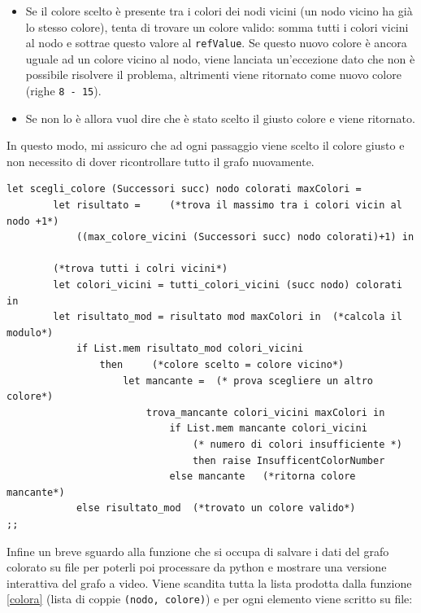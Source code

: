 \begin{itemize}
	\item Se il colore scelto è presente tra i colori dei nodi vicini (un nodo vicino ha già lo stesso colore), tenta di trovare un colore valido: somma tutti i colori vicini al nodo e sottrae questo valore al \lstinline[style=cmd]|refValue|. Se questo nuovo colore è ancora uguale ad un colore vicino al nodo, viene lanciata un'eccezione dato che non è possibile risolvere il problema, altrimenti viene ritornato come nuovo colore (righe \lstinline[style=cmd]|8 - 15|).
	\item Se non lo è allora vuol dire che è stato scelto il giusto colore e viene ritornato.
\end{itemize}

In questo modo, mi assicuro che ad ogni passaggio viene scelto il colore giusto e non necessito di dover ricontrollare tutto il grafo nuovamente.\\

\begin{lstlisting}[style=caml, caption={Funzione ausiliaria a \autoref{colora} che sceglie un colore per il nodo (se possibile).}]
	let scegli_colore (Successori succ) nodo colorati maxColori = 
		let risultato = 	(*trova il massimo tra i colori vicin al nodo +1*)
			((max_colore_vicini (Successori succ) nodo colorati)+1) in
		
		(*trova tutti i colri vicini*)
		let colori_vicini = tutti_colori_vicini (succ nodo) colorati in            
		let risultato_mod = risultato mod maxColori in  (*calcola il modulo*)
			if List.mem risultato_mod colori_vicini  
				then 	 (*colore scelto = colore vicino*)
					let mancante = 	(* prova scegliere un altro colore*)
						trova_mancante colori_vicini maxColori in     
							if List.mem mancante colori_vicini 
								(* numero di colori insufficiente *)
								then raise InsufficentColorNumber                             
							else mancante	(*ritorna colore mancante*)
			else risultato_mod	(*trovato un colore valido*)
;;
\end{lstlisting}

Infine un breve sguardo alla funzione che si occupa di salvare i dati del grafo colorato su file per poterli poi processare da python e mostrare una versione interattiva del grafo a video. Viene scandita tutta la lista prodotta dalla funzione \autoref{colora} (lista di coppie \lstinline[style=cmd]|(nodo, colore)|) e per ogni elemento viene scritto  su file: 

